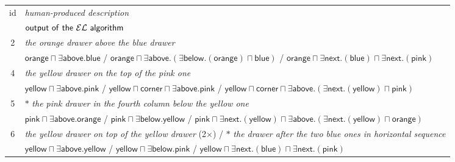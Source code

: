 

\begin{figure*}[thb]

\begin{footnotesize}
\begin{tabular}{|@{\ }c@{\ }|p{}@{\ }|}\hline
\multirow{2}{*}{id} & \textit{human-produced description} \\
& $\mathsf{output\ of\ the\ \el\ algorithm}$\\\hline
\multirow{2}{*}{2} & \textit{the orange drawer above the blue drawer} \\
&  $\bm{\mathsf{orange} \sqcap \exists \mathsf{above}.\mathsf{blue}}$ / $\mathsf{orange} \sqcap \exists \mathsf{above}.(\exists \mathsf{below}.(\mathsf{orange}) \sqcap \mathsf{blue})$ / $ \mathsf{orange} \sqcap \exists \mathsf{next}.(\mathsf{blue}) \sqcap \exists \mathsf{next}.(\mathsf{pink})$\\\hline
\multirow{2}{*}{4} & \textit{the yellow drawer on the top of the pink one} \\ 
&  $\bm{\mathsf{yellow} \sqcap \exists \mathsf{above}.\mathsf{pink}}$  / $\mathsf{yellow}  \sqcap \mathsf{corner} \sqcap \exists \mathsf{above}.\mathsf{pink}$  / $\mathsf{yellow} \sqcap \mathsf{corner} \sqcap \exists \mathsf{above}.(\exists \mathsf{next}.(\mathsf{yellow}) \sqcap \mathsf{pink})$\\\hline
\multirow{2}{*}{5} & $\ast$ \textit{the pink drawer in the fourth column below the yellow one}\\
&  $\mathsf{pink} \sqcap \exists \mathsf{above}.\mathsf{orange}$  / $\mathsf{pink} \sqcap \exists \mathsf{below}.\mathsf{yellow}$  / $ \mathsf{pink} \sqcap \exists \mathsf{next}.(\mathsf{yellow}) \sqcap \exists \mathsf{above}.(\exists \mathsf{next}.(\mathsf{yellow}) \sqcap \mathsf{orange})$\\\hline
\multirow{2}{*}{6} & \textit{the yellow drawer on top of the yellow drawer} (2$\times$) / $\ast$ \textit{the drawer after the two blue ones in horizontal sequence}\\
&  $\bm{\mathsf{yellow} \sqcap \exists \mathsf{above}.\mathsf{yellow}}$  / $\mathsf{yellow} \sqcap \exists \mathsf{below}.\mathsf{pink}$  / $\mathsf{yellow} \sqcap \exists \mathsf{next}.(\mathsf{blue}) \sqcap \exists \mathsf{next}.(\mathsf{pink})$\\\hline

\end{tabular}
\end{footnotesize}
\end{figure*}
